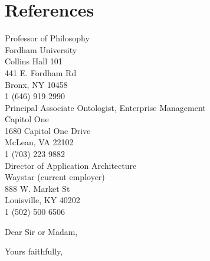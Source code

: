 \section{References}
\begin{cvcolumns}
  {Professor of Philosophy 
  \\ Fordham University 
  \\ Collins Hall 101
  \\ 441 E. Fordham Rd
  \\ Bronx, NY 10458
  \\ 1 (646) 919 2990 
  \\ }
  {Principal Associate Ontologist, Enterprise Management
  \\ Capitol One
  \\ 1680 Capitol One Drive
  \\ McLean, VA 22102
  \\ 1 (703) 223 9882
  \\ }
{Director of Application Architecture
	\\ Waystar (current employer)
	\\ 888 W. Market St
	\\ Louisville, KY 40202
	\\ 1 (502) 500 6506 
	\\ }
\end{cvcolumns}
\clearpage
\date{Date}
\opening{Dear Sir or Madam,}
\closing{Yours faithfully,}
\makelettertitle
\makeletterclosing
